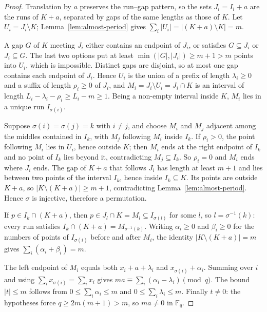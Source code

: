 \documentclass[11pt,a4paper]{article}
\theoremstyle{definition}
\theoremstyle{remark}
\newcommand{\Fq}{\mathbb{F}_q}
\begin{document}
\begin{proof}
  Translation by $a$ preserves the run--gap pattern, so the sets $J_i=I_i+a$ are the runs of
  $K+a$, separated by gaps of the same lengths as those of $K$.
  Let $U_i=J_i\setminus K$; Lemma~\ref{lem:almost-period} gives
  $\sum_i|U_i|=|(K+a)\setminus K|=m$.

  A gap $G$ of $K$ meeting $J_i$ either contains an endpoint of $J_i$, or satisfies
  $G\subseteq J_i$ or $J_i\subseteq G$.
  The last two options put at least $\min(|G|,|J_i|)\geq m+1>m$ points into $U_i$, which is
  impossible.
  Distinct gaps are disjoint, so at most one gap contains each endpoint of $J_i$.
  Hence $U_i$ is the union of a prefix of length $\lambda_i\geq0$ and a suffix of length
  $\rho_i\geq0$ of $J_i$, and $M_i=J_i\setminus U_i=J_i\cap K$ is an interval of length
  $L_i-\lambda_i-\rho_i\geq L_i-m\geq1$.
  Being a non-empty interval inside $K$, $M_i$ lies in a unique run $I_{\sigma(i)}$.

  Suppose $\sigma(i)=\sigma(j)=k$ with $i\ne j$, and choose $M_i$ and $M_j$ adjacent among
  the middles contained in $I_k$, with $M_j$ following $M_i$ inside $I_k$.
  If $\rho_i>0$, the point following $M_i$ lies in $U_i$, hence outside $K$; then $M_i$ ends
  at the right endpoint of $I_k$ and no point of $I_k$ lies beyond it, contradicting
  $M_j\subseteq I_k$.
  So $\rho_i=0$ and $M_i$ ends where $J_i$ ends.
  The gap of $K+a$ that follows $J_i$ has length at least $m+1$ and lies between two points
  of the interval $I_k$, hence inside $I_k\subseteq K$.
  Its points are outside $K+a$, so $|K\setminus(K+a)|\geq m+1$, contradicting
  Lemma~\ref{lem:almost-period}.
  Hence $\sigma$ is injective, therefore a permutation.

  If $p\in I_k\cap(K+a)$, then $p\in J_l\cap K=M_l\subseteq I_{\sigma(l)}$ for some $l$, so
  $l=\sigma^{-1}(k)$: every run satisfies $I_k\cap(K+a)=M_{\sigma^{-1}(k)}$.
  Writing $\alpha_i\geq0$ and $\beta_i\geq0$ for the numbers of points of $I_{\sigma(i)}$
  before and after $M_i$, the identity $|K\setminus(K+a)|=m$ gives
  $\sum_i(\alpha_i+\beta_i)=m$.

  The left endpoint of $M_i$ equals both $x_i+a+\lambda_i$ and $x_{\sigma(i)}+\alpha_i$.
  Summing over $i$ and using $\sum_ix_{\sigma(i)}=\sum_ix_i$ gives
  $ma\equiv\sum_i(\alpha_i-\lambda_i)\pmod q$.
  The bound $|t|\leq m$ follows from $0\leq\sum_i\alpha_i\leq m$ and
  $0\leq\sum_i\lambda_i\leq m$.
  Finally $t\ne0$: the hypotheses force $q\geq2m(m+1)>m$, so $ma\ne0$ in $\Fq$.
\end{proof}
\end{document}
